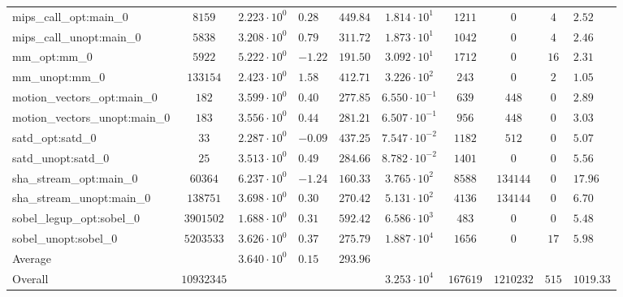 \begin{tabular}{|l|c|HHc|c|c|c|cH|}
mips\_call\_opt:main\_0                         & $ 8159     $ & $ 2.223 \cdot 10^{0} $ & $ 0.28  $ & $ 449.84 $ & $ 1.814 \cdot 10^{1}  $ & $ 1211   $ & $ 0       $ & $ 4   $ & $ 2.52    $ \\
mips\_call\_unopt:main\_0                       & $ 5838     $ & $ 3.208 \cdot 10^{0} $ & $ 0.79  $ & $ 311.72 $ & $ 1.873 \cdot 10^{1}  $ & $ 1042   $ & $ 0       $ & $ 4   $ & $ 2.46    $ \\
mm\_opt:mm\_0                                   & $ 5922     $ & $ 5.222 \cdot 10^{0} $ & $ -1.22 $ & $ 191.50 $ & $ 3.092 \cdot 10^{1}  $ & $ 1712   $ & $ 0       $ & $ 16  $ & $ 2.31    $ \\
mm\_unopt:mm\_0                                 & $ 133154   $ & $ 2.423 \cdot 10^{0} $ & $ 1.58  $ & $ 412.71 $ & $ 3.226 \cdot 10^{2}  $ & $ 243    $ & $ 0       $ & $ 2   $ & $ 1.05    $ \\
motion\_vectors\_opt:main\_0                    & $ 182      $ & $ 3.599 \cdot 10^{0} $ & $ 0.40  $ & $ 277.85 $ & $ 6.550 \cdot 10^{-1} $ & $ 639    $ & $ 448     $ & $ 0   $ & $ 2.89    $ \\
motion\_vectors\_unopt:main\_0                  & $ 183      $ & $ 3.556 \cdot 10^{0} $ & $ 0.44  $ & $ 281.21 $ & $ 6.507 \cdot 10^{-1} $ & $ 956    $ & $ 448     $ & $ 0   $ & $ 3.03    $ \\
satd\_opt:satd\_0                               & $ 33       $ & $ 2.287 \cdot 10^{0} $ & $ -0.09 $ & $ 437.25 $ & $ 7.547 \cdot 10^{-2} $ & $ 1182   $ & $ 512     $ & $ 0   $ & $ 5.07    $ \\
satd\_unopt:satd\_0                             & $ 25       $ & $ 3.513 \cdot 10^{0} $ & $ 0.49  $ & $ 284.66 $ & $ 8.782 \cdot 10^{-2} $ & $ 1401   $ & $ 0       $ & $ 0   $ & $ 5.56    $ \\
sha\_stream\_opt:main\_0                        & $ 60364    $ & $ 6.237 \cdot 10^{0} $ & $ -1.24 $ & $ 160.33 $ & $ 3.765 \cdot 10^{2}  $ & $ 8588   $ & $ 134144  $ & $ 0   $ & $ 17.96   $ \\
sha\_stream\_unopt:main\_0                      & $ 138751   $ & $ 3.698 \cdot 10^{0} $ & $ 0.30  $ & $ 270.42 $ & $ 5.131 \cdot 10^{2}  $ & $ 4136   $ & $ 134144  $ & $ 0   $ & $ 6.70    $ \\
sobel\_legup\_opt:sobel\_0                      & $ 3901502  $ & $ 1.688 \cdot 10^{0} $ & $ 0.31  $ & $ 592.42 $ & $ 6.586 \cdot 10^{3}  $ & $ 483    $ & $ 0       $ & $ 0   $ & $ 5.48    $ \\
sobel\_unopt:sobel\_0                           & $ 5203533  $ & $ 3.626 \cdot 10^{0} $ & $ 0.37  $ & $ 275.79 $ & $ 1.887 \cdot 10^{4}  $ & $ 1656   $ & $ 0       $ & $ 17  $ & $ 5.98    $ \\
\hline
Average                                         & $          $ & $ 3.640 \cdot 10^{0} $ & $ 0.15  $ & $ 293.96 $ & $                     $ & $        $ & $         $ & $     $ & $         $ \\
\hline
Overall                                         & $ 10932345 $ & $                    $ & $       $ & $        $ & $ 3.253 \cdot 10^{4}  $ & $ 167619 $ & $ 1210232 $ & $ 515 $ & $ 1019.33 $ \\
\hline
\end{tabular}
